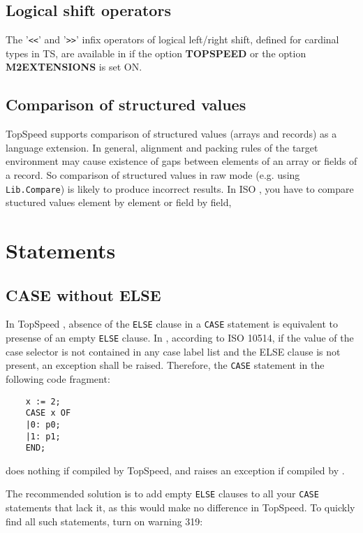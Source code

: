 \subsection{Logical shift operators}

    The '\verb'<<'' and '\verb'>>'' infix operators of logical
    left/right shift, defined for cardinal types in TS, are available in
    \XDS{} if the option {\bf TOPSPEED} or the option {\bf M2EXTENSIONS} is 
    set ON.

\subsection{Comparison of structured values}

    TopSpeed \mt{} supports comparison of structured values (arrays and 
    records) as a language extension. In general, alignment and 
    packing rules of the target environment may cause existence of 
    gaps between elements of an array or fields of a record. 
    So comparison of structured values in raw mode (e.g. using 
    \verb'Lib.Compare') is likely to produce incorrect results.
    In ISO \mt{}, you have to compare stuctured values element by element 
    or field by field,


\section{Statements}

\subsection{CASE without ELSE}

In TopSpeed \mt{}, absence of the \verb'ELSE' clause in a \verb'CASE'
statement is equivalent to presense of an empty \verb'ELSE' clause.
In \xds{} \mt{}, according to ISO 10514, if the value of the case
selector is not contained in any case label list and the ELSE clause
is not present, an exception shall be raised. Therefore, the \verb'CASE'
statement in the following code fragment:

\begin{verbatim}
    x := 2;
    CASE x OF
    |0: p0;
    |1: p1;
    END;
\end{verbatim}

does nothing if compiled by TopSpeed, and raises an exception
if compiled by \xds{}.

The recommended solution is to add empty \verb'ELSE' clauses to all your
\verb'CASE' statements that lack it, as this would make no difference in 
TopSpeed. To quickly find all such statements, turn on warning 319:

